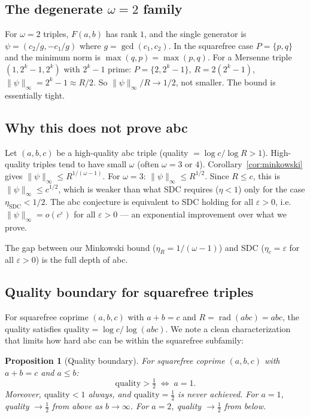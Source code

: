 \documentclass[12pt]{article}
\newtheorem{proposition}[theorem]{Proposition}
\theoremstyle{definition}
\DeclareMathOperator{\rad}{rad}
\begin{document}
\subsection{The degenerate \texorpdfstring{$\omega=2$}{omega=2} family}

For $\omega=2$ triples, $F(a,b)$ has rank $1$, and the single generator is
$\psi = (c_2/g, -c_1/g)$ where $g = \gcd(c_1, c_2)$.  In the squarefree case
$P=\{p,q\}$ and the minimum norm is $\max(q,p)=\max(p,q)$.
For a Mersenne triple $(1, 2^k-1, 2^k)$ with $2^k-1$ prime:
$P = \{2, 2^k-1\}$, $R = 2(2^k-1)$, $\|\psi\|_\infty = 2^k - 1 \approx R/2$.
So $\|\psi\|_\infty / R \to 1/2$, not smaller.  The bound is essentially tight.

\subsection{Why this does not prove abc}

Let $(a,b,c)$ be a high-quality abc triple (quality $= \log c / \log R > 1$).
High-quality triples tend to have small $\omega$ (often $\omega = 3$ or $4$).
Corollary~\ref{cor:minkowski} gives $\|\psi\|_\infty \le R^{1/(\omega-1)}$.
For $\omega = 3$: $\|\psi\|_\infty \le R^{1/2}$.  Since $R \le c$, this is
$\|\psi\|_\infty \le c^{1/2}$, which is weaker than what SDC requires ($\eta < 1$)
only for the case $\eta_{\text{SDC}} < 1/2$.  The abc conjecture is equivalent
to SDC holding for all $\varepsilon > 0$, i.e.\ $\|\psi\|_\infty = o(c^\varepsilon)$
for all $\varepsilon>0$ --- an exponential improvement over what we prove.

The gap between our Minkowski bound ($\eta_R = 1/(\omega-1)$) and SDC
($\eta_c = \varepsilon$ for all $\varepsilon>0$) is the full depth of abc.

\subsection{Quality boundary for squarefree triples}

For squarefree coprime $(a,b,c)$ with $a + b = c$ and $R = \rad(abc) = abc$,
the quality satisfies $\mathrm{quality} = \log c / \log(abc)$.  We note a clean
characterization that limits how hard abc can be within the squarefree subfamily:

\begin{proposition}[Quality boundary]\label{prop:quality}
For squarefree coprime $(a,b,c)$ with $a + b = c$ and $a \le b$:
\[
  \mathrm{quality} > \tfrac{1}{2} \;\iff\; a = 1.
\]
Moreover, $\mathrm{quality} < 1$ always, and $\mathrm{quality} = \tfrac{1}{2}$ is
never achieved.  For $a = 1$, quality $\to \tfrac{1}{2}$ from above as $b \to \infty$.
For $a = 2$, quality $\to \tfrac{1}{2}$ from below.
\end{proposition}
\end{document}
